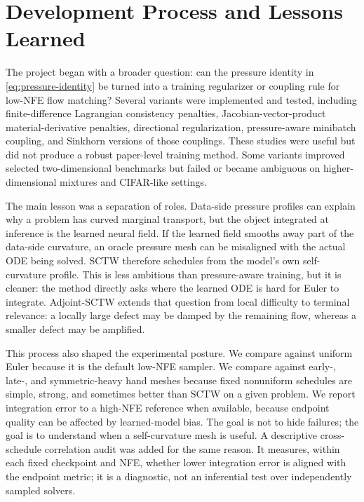 \section{Development Process and Lessons Learned}
\label{sec:process}

The project began with a broader question: can the pressure identity in
\cref{eq:pressure-identity} be turned into a training regularizer or coupling rule for low-NFE
flow matching? Several variants were implemented and tested, including finite-difference
Lagrangian consistency penalties, Jacobian-vector-product material-derivative penalties,
directional regularization, pressure-aware minibatch coupling, and Sinkhorn versions of those
couplings. These studies were useful but did not produce a robust paper-level training method.
Some variants improved selected two-dimensional benchmarks but failed or became ambiguous on
higher-dimensional mixtures and CIFAR-like settings.

The main lesson was a separation of roles. Data-side pressure profiles can explain why a problem
has curved marginal transport, but the object integrated at inference is the learned neural field.
If the learned field smooths away part of the data-side curvature, an oracle pressure mesh can be
misaligned with the actual ODE being solved. SCTW therefore schedules from the model's own
self-curvature profile. This is less ambitious than pressure-aware training, but it is cleaner:
the method directly asks where the learned ODE is hard for Euler to integrate. Adjoint-SCTW extends
that question from local difficulty to terminal relevance: a locally large defect may be damped by
the remaining flow, whereas a smaller defect may be amplified.

This process also shaped the experimental posture. We compare against uniform Euler because it is
the default low-NFE sampler. We compare against early-, late-, and symmetric-heavy hand meshes
because fixed nonuniform schedules are simple, strong, and sometimes better than SCTW on a given
problem. We report integration error to a high-NFE reference when available, because endpoint
quality can be affected by learned-model bias. The goal is not to hide failures; the goal is to
understand when a self-curvature mesh is useful. A descriptive cross-schedule correlation audit
was added for the same reason. It measures, within each fixed checkpoint and NFE, whether lower
integration error is aligned with the endpoint metric; it is a diagnostic, not an inferential
test over independently sampled solvers.
